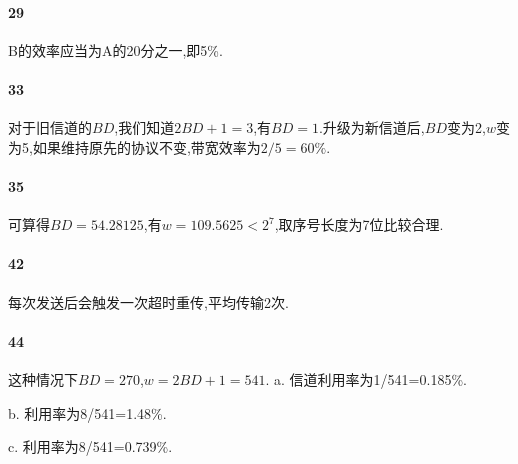 \documentclass[a4paper]{article}
\begin{document}
\paragraph{29}
B的效率应当为A的20分之一,即5\%.
\paragraph{33}
对于旧信道的$BD$,我们知道$2BD+1=3$,有$BD=1$.升级为新信道后,$BD$变为2,$w$变为5,如果维持原先的协议不变,带宽效率为$2/5=60\%$.
\paragraph{35}
可算得$BD=54.28125$,有$w=109.5625<2^7$,取序号长度为7位比较合理.
\paragraph{42}
每次发送后会触发一次超时重传,平均传输2次.
\paragraph{44}这种情况下$BD=270$,$w=2BD+1=541$.
a. 信道利用率为1/541=0.185\%.

b. 利用率为8/541=1.48\%.

c. 利用率为8/541=0.739\%.
\end{document}
